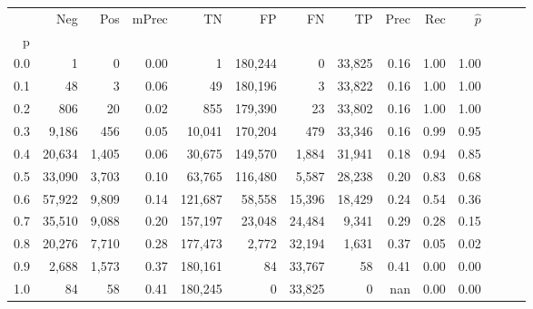 \begin{tabular}{rrrrrrrrrrrrrr}
\toprule
{} &     Neg &    Pos & mPrec &       TN &       FP &      FN &      TP &  Prec &   Rec & $\hat{p}$ \\
p   &         &        &       &          &          &         &         &       &       &           \\
\midrule
0.0 &       1 &      0 &  0.00 &        1 &  180,244 &       0 &  33,825 &  0.16 &  1.00 &      1.00 \\
0.1 &      48 &      3 &  0.06 &       49 &  180,196 &       3 &  33,822 &  0.16 &  1.00 &      1.00 \\
0.2 &     806 &     20 &  0.02 &      855 &  179,390 &      23 &  33,802 &  0.16 &  1.00 &      1.00 \\
0.3 &   9,186 &    456 &  0.05 &   10,041 &  170,204 &     479 &  33,346 &  0.16 &  0.99 &      0.95 \\
0.4 &  20,634 &  1,405 &  0.06 &   30,675 &  149,570 &   1,884 &  31,941 &  0.18 &  0.94 &      0.85 \\
0.5 &  33,090 &  3,703 &  0.10 &   63,765 &  116,480 &   5,587 &  28,238 &  0.20 &  0.83 &      0.68 \\
0.6 &  57,922 &  9,809 &  0.14 &  121,687 &   58,558 &  15,396 &  18,429 &  0.24 &  0.54 &      0.36 \\
0.7 &  35,510 &  9,088 &  0.20 &  157,197 &   23,048 &  24,484 &   9,341 &  0.29 &  0.28 &      0.15 \\
0.8 &  20,276 &  7,710 &  0.28 &  177,473 &    2,772 &  32,194 &   1,631 &  0.37 &  0.05 &      0.02 \\
0.9 &   2,688 &  1,573 &  0.37 &  180,161 &       84 &  33,767 &      58 &  0.41 &  0.00 &      0.00 \\
1.0 &      84 &     58 &  0.41 &  180,245 &        0 &  33,825 &       0 &   nan &  0.00 &      0.00 \\
\bottomrule
\end{tabular}
